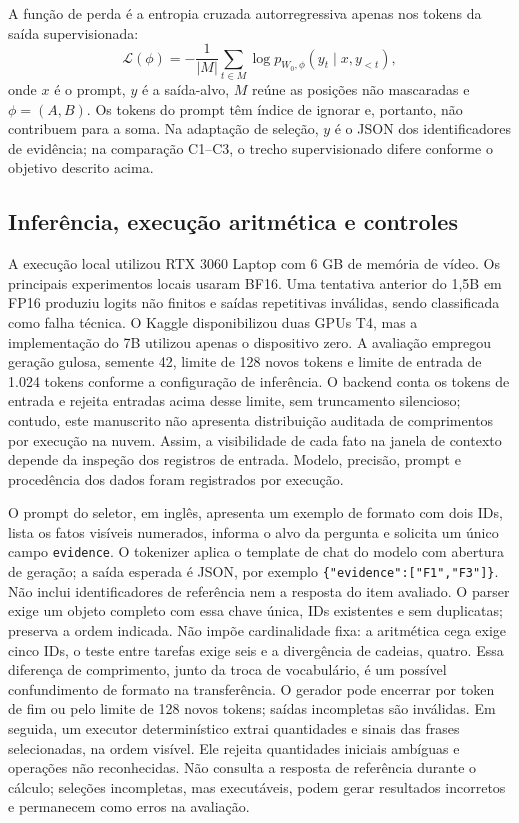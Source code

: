 \documentclass[12pt,a4paper]{article}
\begin{document}
A função de perda é a entropia cruzada autorregressiva apenas nos tokens da saída supervisionada:
\begin{equation}\label{eq:loss-pt}
\mathcal{L}(\phi)=-\frac{1}{|M|}\sum_{t\in M}
\log p_{W_0,\phi}(y_t\mid x,y_{<t}),
\end{equation}
onde $x$ é o prompt, $y$ é a saída-alvo, $M$ reúne as posições não mascaradas e $\phi=(A,B)$. Os tokens do prompt têm índice de ignorar e, portanto, não contribuem para a soma. Na adaptação de seleção, $y$ é o JSON dos identificadores de evidência; na comparação C1--C3, o trecho supervisionado difere conforme o objetivo descrito acima.

\subsection{Inferência, execução aritmética e controles}
A execução local utilizou RTX 3060 Laptop com 6 GB de memória de vídeo. Os principais experimentos locais usaram BF16. Uma tentativa anterior do 1,5B em FP16 produziu logits não finitos e saídas repetitivas inválidas, sendo classificada como falha técnica. O Kaggle disponibilizou duas GPUs T4, mas a implementação do 7B utilizou apenas o dispositivo zero. A avaliação empregou geração gulosa, semente 42, limite de 128 novos tokens e limite de entrada de 1.024 tokens conforme a configuração de inferência. O backend conta os tokens de entrada e rejeita entradas acima desse limite, sem truncamento silencioso; contudo, este manuscrito não apresenta distribuição auditada de comprimentos por execução na nuvem. Assim, a visibilidade de cada fato na janela de contexto depende da inspeção dos registros de entrada. Modelo, precisão, prompt e procedência dos dados foram registrados por execução.

O prompt do seletor, em inglês, apresenta um exemplo de formato com dois IDs, lista os fatos visíveis numerados, informa o alvo da pergunta e solicita um único campo \texttt{evidence}. O tokenizer aplica o template de chat do modelo com abertura de geração; a saída esperada é JSON, por exemplo \texttt{\{"evidence":["F1","F3"]\}}. Não inclui identificadores de referência nem a resposta do item avaliado. O parser exige um objeto completo com essa chave única, IDs existentes e sem duplicatas; preserva a ordem indicada. Não impõe cardinalidade fixa: a aritmética cega exige cinco IDs, o teste entre tarefas exige seis e a divergência de cadeias, quatro. Essa diferença de comprimento, junto da troca de vocabulário, é um possível confundimento de formato na transferência. O gerador pode encerrar por token de fim ou pelo limite de 128 novos tokens; saídas incompletas são inválidas. Em seguida, um executor determinístico extrai quantidades e sinais das frases selecionadas, na ordem visível. Ele rejeita quantidades iniciais ambíguas e operações não reconhecidas. Não consulta a resposta de referência durante o cálculo; seleções incompletas, mas executáveis, podem gerar resultados incorretos e permanecem como erros na avaliação.
\end{document}
